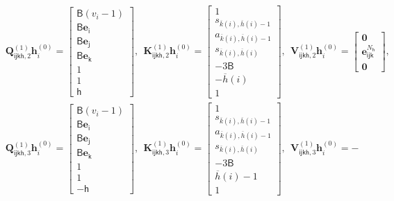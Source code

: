 \documentclass[10pt]{article}
\renewcommand{\bar}{\overline}
\newcommand{\<}{\left\langle}
\renewcommand{\>}{\right\rangle}
\renewcommand{\bQ}{\mathbf{Q}}
\newcommand{\bzero}{{\mathbf 0}}
\newcommand{\state}{{s}}
\newcommand{\action}{{a}}
\newcommand{\tfthres}{{\mathsf{B}}}   %
\newcommand{\Numvi}{{N}}
\newcommand{\oddeven}{{v}}
\def\bK{{\mathbf K}}
\def\bQ{{\mathbf Q}}
\def\bV{{\mathbf V}}
\def\be{{\mathbf e}}
\def\bh{{\mathbf h}}
\def\si{{\mathsf{i}}}
\def\sj{{\mathsf{j}}}
\def\sk{{\mathsf{k}}}
\def\sh{{\mathsf{h}}}
\begin{document}
\begin{align*}
&\bQ^{(1)}_{\si\sj\sk\sh,2}\bh^{(0)}_{i}=
\begin{bmatrix}
\tfthres(\oddeven_i-1)\\
        \tfthres\be_\si\\
         \tfthres\be_\sj\\
          \tfthres\be_\sk\\
          1\\
          1\\
         \sh
    \end{bmatrix},~~ \bK^{(1)}_{\si\sj\sk\sh,2}\bh^{(0)}_{i}=\begin{bmatrix}1\\
     \state_{\bar{k}(i),\bar{h}(i)-1}\\
        \action_{\bar{k}(i),\bar{h}(i)-1}\\
         \state_{\bar{k}(i),\bar{h}(i)}\\
        -3\tfthres\\
     - \bar{h}(i)\\
        1
\end{bmatrix},~~ \bV^{(1)}_{\si\sj\sk\sh,2}\bh^{(0)}_{i}=
\begin{bmatrix}
\bzero\\\be^{\Numvi_\sh}_{\si\sj\sk}
\\\bzero\end{bmatrix},
\\
&\bQ^{(1)}_{\si\sj\sk\sh,3}\bh^{(0)}_{i}=
\begin{bmatrix}
\tfthres(\oddeven_i-1)\\
        \tfthres\be_\si\\
         \tfthres\be_\sj\\
          \tfthres\be_\sk\\
          1\\
          1\\
         -\sh
    \end{bmatrix},~~ \bK^{(1)}_{\si\sj\sk\sh,3}\bh^{(0)}_{i}=\begin{bmatrix}1\\
     \state_{\bar{k}(i),\bar{h}(i)-1}\\
        \action_{\bar{k}(i),\bar{h}(i)-1}\\
         \state_{\bar{k}(i),\bar{h}(i)}\\
        -3\tfthres\\
      \bar{h}(i)-1\\
        1
\end{bmatrix},~~ \bV^{(1)}_{\si\sj\sk\sh,3}\bh^{(0)}_{i}=-

\end{align*}
\end{document}
